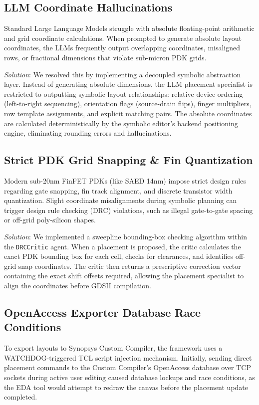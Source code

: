 \subsection{LLM Coordinate Hallucinations}
Standard Large Language Models struggle with absolute floating-point arithmetic and grid coordinate calculations. When prompted to generate absolute layout coordinates, the LLMs frequently output overlapping coordinates, misaligned rows, or fractional dimensions that violate sub-micron PDK grids. 

\textit{Solution}: We resolved this by implementing a decoupled symbolic abstraction layer. Instead of generating absolute dimensions, the LLM placement specialist is restricted to outputting symbolic layout relationships: relative device ordering (left-to-right sequencing), orientation flags (source-drain flips), finger multipliers, row template assignments, and explicit matching pairs. The absolute coordinates are calculated deterministically by the symbolic editor's backend positioning engine, eliminating rounding errors and hallucinations.

\subsection{Strict PDK Grid Snapping \& Fin Quantization}
Modern sub-20nm FinFET PDKs (like SAED 14nm) impose strict design rules regarding gate snapping, fin track alignment, and discrete transistor width quantization. Slight coordinate misalignments during symbolic planning can trigger design rule checking (DRC) violations, such as illegal gate-to-gate spacing or off-grid poly-silicon shapes.

\textit{Solution}: We implemented a sweepline bounding-box checking algorithm within the \texttt{DRCCritic} agent. When a placement is proposed, the critic calculates the exact PDK bounding box for each cell, checks for clearances, and identifies off-grid snap coordinates. The critic then returns a prescriptive correction vector containing the exact shift offsets required, allowing the placement specialist to align the coordinates before GDSII compilation.

\subsection{OpenAccess Exporter Database Race Conditions}
To export layouts to Synopsys Custom Compiler, the framework uses a WATCHDOG-triggered TCL script injection mechanism. Initially, sending direct placement commands to the Custom Compiler's OpenAccess database over TCP sockets during active user editing caused database lockups and race conditions, as the EDA tool would attempt to redraw the canvas before the placement update completed.

